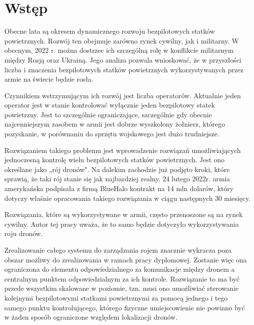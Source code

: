 

\newcommand{\kierunek}{INFORMATYKA}
\newcommand{\stopien}{STUDIA II$^{\mathrm{o}}$} %
\newcommand{\temat}{MOBILNY SYSTEM ZARZĄDZANIA I STEROWANIA BEZPILOTOWYM STATKIEM LATAJĄCYM}
\newcommand{\data}{Warszawa 2022}
\newcommand{\autor}{Norbert WASZKOWIAK}
\newcommand{\promotor}{dr inż. Michał DYK}
\newcommand{\zgoda}{TAK} %
\newcommand{\specjalnosc}{SYSTEMY INFORMATYCZNE}

\newcommand{\bibTitle}[1]{``#1''}




\inserttitlepage

\section*{Wstęp} 


Obecne lata są okresem dynamicznego rozwoju bezpilotowych statków powietrznych. Rozwój ten obejmuje zarówno rynek cywilny, jak i militarny. W obecnym, 2022 r. można dostrzec ich szczególną rolę w konflikcie militarnym między Rosją oraz Ukrainą. Jego analiza pozwala wnioskować, że w przyszłości liczba i znaczenia bezpilotowych statków powietrznych wykorzystywanych przez armie na świecie będzie rosła.

Czynnikiem wstrzymującym ich rozwój jest liczba operatorów. Aktualnie jeden operator jest w stanie kontrolować wyłącznie jeden bezpilotowy statek powietrzny. Jest to szczególnie ograniczające, szczególnie gdy obecnie najcenniejszym zasobem w armii jest dobrze wyszkolony żołnierz, którego pozyskanie, w porównaniu do sprzętu wojskowego jest dużo trudniejsze.

Rozwiązaniem takiego problemu jest wprowadzenie rozwiązań umożliwiających jednoczesną kontrolę wielu bezpilotowych statków powietrznych. Jest ono określane jako „rój dronów". Na dalekim zachodzie już podjęto kroki, które sprawią, że taki rój stanie się jak najbardziej realny. 24 lutego 2022r. armia amerykańska podpisała z firmą BlueHalo kontrakt na 14 mln dolarów, który dotyczy właśnie opracowania takiego rozwiązania w ciągu następnych 30 miesięcy. \cite{usa-roj}

Rozwiązania, które są wykorzystywane w armii, często przenoszone są na rynek cywilny. Autor tej pracy uważa, że to samo będzie dotyczyło wykorzystywania roju dronów.

Zrealizowanie całego systemu do zarządzania rojem znacznie wykracza poza obszar możliwy do zrealizowania w ramach pracy dyplomowej. Zostanie więc ona ograniczona do elementu odpowiedzialnego za komunikacje między dronem a centralnym punktem odpowiedzialnym za ich kontrole. Rozwiązanie to ma być przede wszystkim skalowane w poziomie, tzn. musi ono umożliwiać sterowanie kolejnymi bezpilotowymi statkami powietrznymi za pomocą jednego i tego samego punktu kontrolującego, którego fizyczne umiejscowienie nie powinno być w żaden sposób ograniczone względem lokalizacji dronów.

